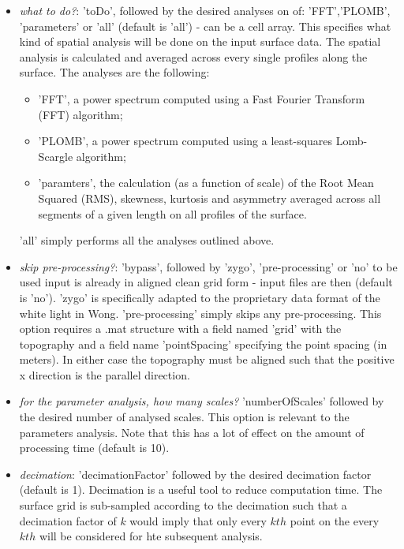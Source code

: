 \documentclass[12pt,a4paper]{article}
\begin{document}
\begin{itemize}
\begin{itemize}
\item \textit{what to do?}: 'toDo', followed by the desired analyses on of: 'FFT','PLOMB', 'parameters' or 'all' (default is 'all') - can be a cell array. This specifies what kind of spatial analysis will be done on the input surface data. The spatial analysis is calculated and averaged across every single profiles along the surface.  The analyses are the following:
	\begin{itemize}
	\item 'FFT', a power spectrum computed using a Fast Fourier Transform (FFT) algorithm; 
	\item 'PLOMB', a power spectrum computed using a least-squares Lomb-Scargle algorithm;
	\item 'paramters', the calculation (as a function of scale) of the Root Mean Squared (RMS), skewness, kurtosis and asymmetry averaged across all segments of a given length on all profiles of the surface.
	\end{itemize}

'all' simply performs all the analyses outlined above.

\item \textit{skip pre-processing?}: 'bypass', followed by 'zygo', 'pre-processing' or 'no' to  be used input is already in aligned clean grid form - input files are then (default is 'no'). 'zygo' is specifically adapted to the proprietary data format of the white light in Wong. 'pre-processing' simply skips any pre-processing. This option requires a .mat structure with a field named 'grid' with the topography and a field name 'pointSpacing' specifying the point spacing (in meters). In either case the topography must be aligned such that the positive x direction is the parallel direction.	

\item \textit{for the parameter analysis, how many scales?} 'numberOfScales' followed by the desired number of analysed scales. This option is relevant to the parameters analysis. Note that this has a lot of effect on the amount of processing time (default is 10).

\item \textit{decimation}: 'decimationFactor' followed by the desired decimation factor (default is 1). Decimation is a useful tool to reduce computation time. The surface grid is sub-sampled according to the decimation such that a decimation factor of $k$ would imply that only every $kth$ point on the every $kth$ will be considered for hte subsequent analysis.


\end{itemize}
\end{itemize}
\end{document}
